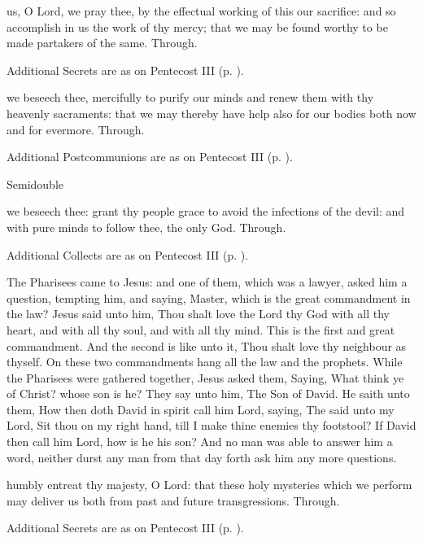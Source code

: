 \secret
{} us, O Lord, we pray thee, by the effectual working of this our sacrifice: and so accomplish in us the work of thy mercy; that we may be found worthy to be made partakers of the same. Through.
\begin{rubric}
    Additional Secrets are as on Pentecost III (p. \pageref{PentecostIII}).
\end{rubric}

\postcommunion
{} we beseech thee, mercifully to purify our minds and renew them with thy heavenly sacraments: that we may thereby have help also for our bodies both now and for evermore. Through.
\begin{rubric}
    Additional Postcommunions are as on Pentecost III (p. \pageref{PentecostIII}).
\end{rubric}

\begin{inhead}
{Semidouble}
\end{inhead}

\collect
{} we beseech thee: grant thy people grace to avoid the infections of the devil: and with pure minds to follow thee, the only God. Through.
\begin{rubric}
    Additional Collects are as on Pentecost III (p. \pageref{PentecostIII}).
\end{rubric}

 The Pharisees came to Jesus: and one of them, which was a lawyer, asked him a question, tempting him, and saying, Master, which is the great commandment in the law? Jesus said unto him, Thou shalt love the Lord thy God with all thy heart, and with all thy soul, and with all thy mind. This is the first and great commandment. And the second is like unto it, Thou shalt love thy neighbour as thyself. On these two commandments hang all the law and the prophets. While the Pharisees were gathered together, Jesus asked them, Saying, What think ye of Christ? whose son is he? They say unto him, The Son of David. He saith unto them, How then doth David in spirit call him Lord, saying, The  said unto my Lord, Sit thou on my right hand, till I make thine enemies thy footstool? If David then call him Lord, how is he his son? And no man was able to answer him a word, neither durst any man from that day forth ask him any more questions.

\secret
{} humbly entreat thy majesty, O Lord: that these holy mysteries which we perform may deliver us both from past and future transgressions. Through.
\begin{rubric}
    Additional Secrets are as on Pentecost III (p. \pageref{PentecostIII}).
\end{rubric}


